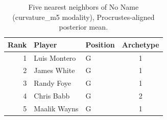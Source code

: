 \begin{table}[htbp]
  \centering\small
  \begin{tabular}{rllc}
    \toprule
    Rank & Player & Position & Archetype \\
    \midrule
    1 & Luis Montero & G & 1 \\
    2 & James White & G & 1 \\
    3 & Randy Foye & G & 1 \\
    4 & Chris Babb & G & 2 \\
    5 & Maalik Wayns & G & 1 \\
    \bottomrule
  \end{tabular}
  \caption{Five nearest neighbors of No Name (curvature_m5 modality), Procrustes-aligned posterior mean.}
  \label{tab:No_Name_neighbors_curvature_m5}
\end{table}

